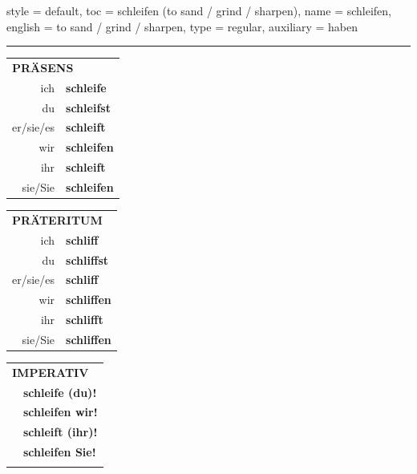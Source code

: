 \begin{verbentry}{
  style = {default},
  toc = {schleifen (to sand / grind / sharpen)},
  name = {schleifen},
  english = {to sand / grind / sharpen},
  type = {regular},
  auxiliary = {haben}
}
 
    
     \vspace{5pt}

    \hrule
    
    \vspace{5pt}

  \begin{tabular}{rl}
     \multicolumn{2}{l}{\textbf{PRÄSENS} }\\
    ich & \textbf{schleife}\\
    du & \textbf{schleifst}\\
    er/sie/es & \textbf{schleift}\\
    wir & \textbf{schleifen}\\
    ihr & \textbf{schleift}\\
    sie/Sie & \textbf{schleifen}\\
  \end{tabular}
  \hfill
  \begin{tabular}{rl}
    \multicolumn{2}{l}{\textbf{PRÄTERITUM} }\\
    ich & \textbf{schliff}\\
    du & \textbf{schliffst}\\
    er/sie/es & \textbf{schliff}\\
    wir & \textbf{schliffen}\\
    ihr & \textbf{schlifft}\\
    sie/Sie & \textbf{schliffen}\\
  \end{tabular}
  \hfill
  \begin{tabular}{rl}
     \multicolumn{2}{l}{\textbf{IMPERATIV} }\\
   & \textbf{schleife (du)!}\\
   & \textbf{schleifen wir!}\\
   & \textbf{schleift (ihr)!}\\
   & \textbf{schleifen Sie!}\\
   & \vspace{10pt}
  \end{tabular}

 \vspace{10pt}


\end{verbentry}
